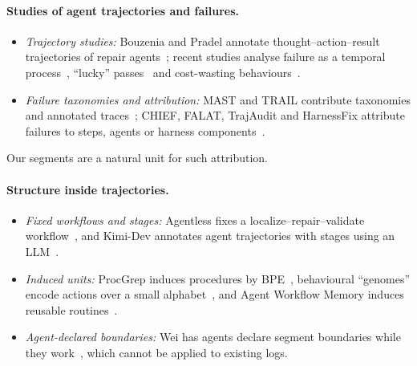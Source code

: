 \documentclass[sigconf,nonacm,10pt]{acmart}
\begin{document}
\paragraph{Studies of agent trajectories and failures.}
\begin{itemize}
  \item \emph{Trajectory studies:} Bouzenia and Pradel annotate thought--action--result
        trajectories of repair agents~\cite{bouzenia2025tar}; recent studies analyse
        failure as a temporal process~\cite{zhao2026failureprocess}, ``lucky''
        passes~\cite{sahoo2026agentlens} and cost-wasting
        behaviours~\cite{hu2026costinefficient}.
  \item \emph{Failure taxonomies and attribution:} MAST and TRAIL contribute taxonomies
        and annotated traces~\cite{cemri2025mast,trail2025}; CHIEF, FALAT, TrajAudit
        and HarnessFix attribute failures to steps, agents or harness
        components~\cite{chief2026,rafi2026falat,trajaudit2026,chen2026harnessfix}.
\end{itemize}
Our segments are a natural unit for such attribution.

\paragraph{Structure inside trajectories.}
\begin{itemize}
  \item \emph{Fixed workflows and stages:} Agentless fixes a localize--repair--validate
        workflow~\cite{xia2025agentless}, and Kimi-Dev annotates agent trajectories
        with stages using an LLM~\cite{kimidev2025}.
  \item \emph{Induced units:} ProcGrep induces procedures by
        BPE~\cite{oderinwale2026procgrep}, behavioural ``genomes'' encode actions over a
        small alphabet~\cite{deng2026genome}, and Agent Workflow Memory induces
        reusable routines~\cite{wang2025awm}.
  \item \emph{Agent-declared boundaries:} Wei has agents declare segment boundaries
        while they work~\cite{wei2026selfsegment}, which cannot be applied to existing
        logs.
\end{itemize}
\end{document}
